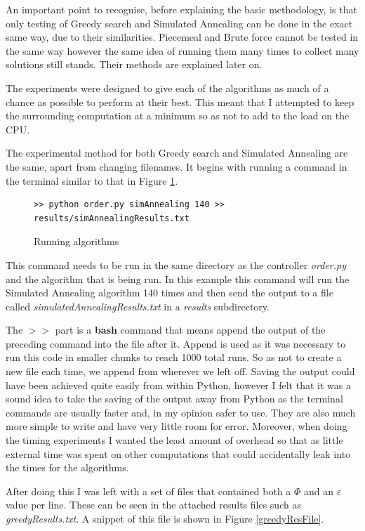 \documentclass[12pt]{report}
\begin{document}
An important point to recognise, before explaining the basic methodology, is that only testing of Greedy search and Simulated Annealing can be done in the exact same way, due to their similarities. Piecemeal and Brute force cannot be tested in the same way however the same idea of running them many times to collect many solutions still stands. Their methods are explained later on.

The experiments were designed to give each of the algorithms as much of a chance as possible to perform at their best. This meant that I attempted to keep the surrounding computation at a minimum so as not to add to the load on the CPU.

The experimental method for both Greedy search and Simulated Annealing are the same, apart from changing filenames. It begins with running a command in the terminal similar to that in Figure \ref{makeResults}.

\begin{figure}[H]
\caption{Running algorithms}
\label{makeResults}
\begin{verbatim}
>> python order.py simAnnealing 140 >> results/simAnnealingResults.txt
\end{verbatim}
\end{figure}
This command needs to be run in the same directory as the controller \textit{order.py} and the algorithm that is being run. In this example this command will run the Simulated Annealing algorithm 140 times and then send the output to a file called \textit{simulatedAnnealingResults.txt} in a \textit{results} subdirectory. 

The $>>$ part is a \textbf{bash} command that means append the output of the preceding command into the file after it. Append is used as it was necessary to run this code in smaller chunks to reach 1000 total runs. So as not to create a new file each time, we append from wherever we left off. Saving the output could have been achieved quite easily from within Python, however I felt that it was a sound idea to take the saving of the output away from Python as the terminal commands are usually faster and, in my opinion safer to use. They are also much more simple to write and have very little room for error. Moreover, when doing the timing experiments I wanted the least amount of overhead so that as little external time was spent on other computations that could accidentally leak into the times for the algorithms.

After doing this I was left with a set of files that contained both a $\Phi$ and an $\varepsilon$ value per line. These can be seen in the attached results files such as \textit{greedyResults.txt}. A snippet of this file is shown in Figure \ref{greedyResFile}.
\end{document}
